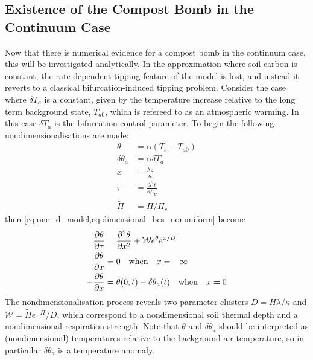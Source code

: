 \subsection{Existence of the Compost Bomb in the Continuum Case}
\label{sec:existence_of_compost_bomb}
Now that there is numerical evidence for a compost bomb in the continuum case, this will be investigated analytically. In the approximation where soil carbon is constant,
the rate dependent tipping feature of the model is lost, and instead it reverts to a classical bifurcation-induced tipping problem.
Consider the case where $\delta T_a$ is a constant, given by the temperature increase relative to the long term background state, $T_{a0}$, which is refereed to as an atmospheric warming.
In this case $\delta T_a$ is the bifurcation control parameter.
To begin the following nondimensionalisations are made:
\begin{subequations}
  \label{eq:nondimensionalisations}
  \begin{align}
    \theta &= \alpha\left(T_s - T_{a0}\right) \label{subeq:nondimensionalisations_soil_temperature}\\
    \delta\theta_a &= \alpha \delta T_a \label{subeq:nondimensionalisations_air_temperature}\\
    x &= \frac{\lambda z}{\kappa}  \label{subeq:nondimensionalisations_depth}\\
    \tau &= \frac{\lambda^2 t}{\kappa\mu_V} \label{subeq:nondimensionalisations_time}\\
    \widetilde{\Pi} &= \Pi/\Pi_c \label{subeq:nondimensionalisations_npp}
  \end{align}
\end{subequations}
then \cref{eq:one_d_model,eq:dimensional_bcs_nonuniform} become
\begin{subequations}
  \label{eq:nondimensional_model_nonuniform}
  \begin{align}
  \pdv{\theta}{\tau} &= \pdv[2]{\theta}{x} + \mathcal{W} e^{\theta}e^{x/D} \label{subeq:nondimensional_model_nonuniform_reaction_diffusion}\\
  \pdv{\theta}{x} &= 0\quad \mathrm{when} \quad x=-\infty \label{subeq:nondimensional_model_nonuniform_bcs_upper}\\
  -\pdv{\theta}{x} &= \theta(0,t) - \delta\theta_a(t) \quad \mathrm{when} \quad x=0             \label{subeq:nondimensional_model_nonuniform_bcs_lower}
  \end{align}
\end{subequations}
The nondimensionalisation process reveals two parameter clusters $D = H\lambda/\kappa$ and $\mathcal{W} = \widetilde{\Pi}e^{-\widetilde{\Pi}}/D$, which
correspond to a nondimensional soil thermal depth and a nondimensional respiration strength. Note that $\theta$ and $\delta\theta_a$ should be interpreted as (nondimensional) temperatures
relative to the background air temperature, so in particular $\delta\theta_a$ is a temperature anomaly.

